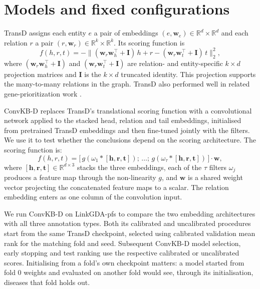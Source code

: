 \documentclass{article}
\newcommand{\method}{LinkGDA}
\begin{document}


\section{Models and fixed configurations}

TransD \cite{ji2015knowledge} assigns each entity $e$ a pair of embeddings
$(e, \mathbf{w}_e) \in \mathbb{R}^d \times \mathbb{R}^d$ and each relation $r$
a pair $(r, \mathbf{w}_r) \in \mathbb{R}^k \times \mathbb{R}^k$. Its scoring
function is
\begin{equation}
  f(h, r, t) = -\bigl\|(\mathbf{w}_r \mathbf{w}_h^\top + \mathbf{I})\,h + r - (\mathbf{w}_r \mathbf{w}_t^\top + \mathbf{I})\,t\bigr\|_2^2,
  \label{eq:transd_supp}
\end{equation}
where $(\mathbf{w}_r \mathbf{w}_h^\top + \mathbf{I})$ and
$(\mathbf{w}_r \mathbf{w}_t^\top + \mathbf{I})$ are relation- and
entity-specific $k \times d$ projection matrices and $\mathbf{I}$ is the
$k \times d$ truncated identity. This projection supports the many-to-many
relations in the graph. TransD also performed well in related
gene-prioritization work \cite{indigena,althagafi2024prioritizing}.

ConvKB-D replaces TransD's translational scoring function with a convolutional
network applied to the stacked head, relation and tail embeddings, initialised
from pretrained TransD embeddings and then fine-tuned jointly with the filters.
We use it to test whether the conclusions depend on the scoring architecture.
The scoring function is:
\begin{equation}
  f(h, r, t) = \bigl[\,g(\omega_1 * [\mathbf{h}, \mathbf{r}, \mathbf{t}]);\,
    \dots;\, g(\omega_\tau * [\mathbf{h}, \mathbf{r}, \mathbf{t}])\,\bigr]
    \cdot \mathbf{w},
  \label{eq:convkb}
\end{equation}
where $[\mathbf{h}, \mathbf{r}, \mathbf{t}] \in \mathbb{R}^{d \times 3}$
stacks the three embeddings, each of the $\tau$ filters $\omega_j$ produces a
feature map through the non-linearity $g$, and $\mathbf{w}$ is a shared weight
vector projecting the concatenated feature maps to a scalar. The relation embedding enters as one column of the convolution input.


We run ConvKB-D on \method{}-pfs to compare the two embedding architectures
with all three annotation types. Both its calibrated and uncalibrated
procedures start from the same TransD checkpoint, selected using calibrated
validation mean rank for the matching fold and seed. Subsequent ConvKB-D
model selection, early stopping and test ranking use the respective calibrated
or uncalibrated scores. Initialising from a fold's own checkpoint matters: a model
started from fold 0 weights and evaluated on another fold would see, through its
initialisation, diseases that fold holds out.
\end{document}
